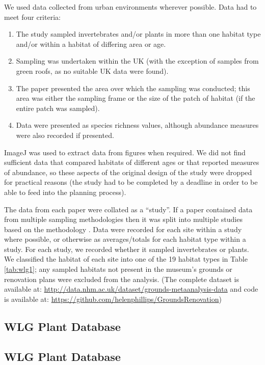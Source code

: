 We used data collected from urban environments wherever possible. Data had to meet four criteria:
\begin{enumerate}
\item The study sampled invertebrates and/or plants in more than one habitat type and/or within a habitat of differing area or age.
\item Sampling was undertaken within the UK (with the exception of samples from green roofs, as no suitable UK data were found).
\item The paper presented the area over which the sampling was conducted; this area was either the sampling frame or the size of the patch of habitat (if the entire patch was sampled). 
\item Data were presented as species richness values, although abundance measures were also recorded if presented.
\end{enumerate}
ImageJ \citep{schindelin:2012fiji} was used to extract data from figures when required. We did not find sufficient data that compared habitats of different ages or that reported measures of abundance, so these aspects of the original design of the study were dropped for practical reasons (the study had to be completed by a deadline in order to be able to feed into the planning process).

The data from each paper were collated as a ``study''. If a paper contained data from multiple sampling methodologies then it was split into multiple studies based on the methodology \citep[following][]{Hudson:2014predicts}. Data were recorded for each site within a study where possible, or otherwise as averages/totals for each habitat type within a study. For each study, we recorded whether it sampled invertebrates or plants. We classified the habitat of each site into one of the 19 habitat types in Table \ref{tab:wlg1}; any sampled habitats not present in the museum's grounds or renovation plans were excluded from the analysis. (The complete dataset is available at: \url{http://data.nhm.ac.uk/dataset/grounds-metaanalysis-data} and code is available at: \url{https://github.com/helenphillips/GroundsRenovation})

\ifappendixStyle %
\subsection{WLG Plant Database}%
\else
\subsection*{WLG Plant Database}
\fi

